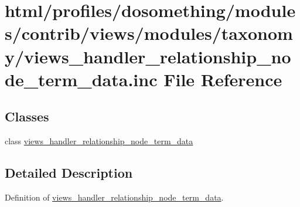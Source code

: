 \hypertarget{views__handler__relationship__node__term__data_8inc}{
\section{html/profiles/dosomething/modules/contrib/views/modules/taxonomy/views\_\-handler\_\-relationship\_\-node\_\-term\_\-data.inc File Reference}
\label{views__handler__relationship__node__term__data_8inc}
}
\subsection*{Classes}
\begin{DoxyCompactItemize}
\item 
class \hyperlink{classviews__handler__relationship__node__term__data}{views\_\-handler\_\-relationship\_\-node\_\-term\_\-data}
\end{DoxyCompactItemize}


\subsection{Detailed Description}
Definition of \hyperlink{classviews__handler__relationship__node__term__data}{views\_\-handler\_\-relationship\_\-node\_\-term\_\-data}. 